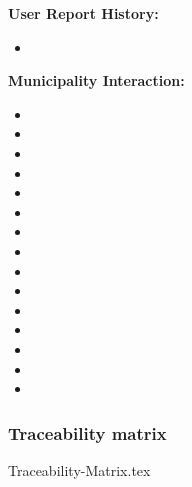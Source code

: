 \textbf{User Report History:}

\begin{itemize}
	\item {}
\end{itemize}



\textbf{Municipality Interaction:}

\begin{itemize}
\item {}
	\item {}
	\item {}
	\item {}
	\item {}
	\item {}
	\item {}
	\item {}
	\item {}
	\item {}
	\item {}
	\item {}
	\item {}
	\item {}
	\item {}
\end{itemize}

\subsubsection{Traceability matrix}
{Traceability-Matrix.tex}

